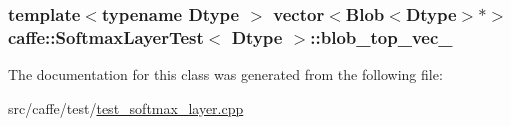 \hypertarget{classcaffe_1_1_softmax_layer_test_ae0fe3f4a4095998e002e305196dc3d9f}{
\subsubsection[{blob\+\_\+top\+\_\+vec\+\_\+}]{\setlength{\rightskip}{0pt plus 5cm}template$<$typename Dtype $>$ vector$<${\bf Blob}$<$Dtype$>$$\ast$$>$ {\bf caffe\+::\+Softmax\+Layer\+Test}$<$ Dtype $>$\+::blob\+\_\+top\+\_\+vec\+\_\+\hspace{0.3cm}{\ttfamily [protected]}}}\label{classcaffe_1_1_softmax_layer_test_ae0fe3f4a4095998e002e305196dc3d9f}


The documentation for this class was generated from the following file\+:\begin{DoxyCompactItemize}
\item 
src/caffe/test/\hyperlink{test__softmax__layer_8cpp}{test\+\_\+softmax\+\_\+layer.\+cpp}\end{DoxyCompactItemize}
